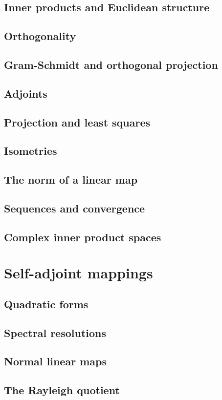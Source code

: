 \documentclass{article}
\begin{document}
\subsection{Inner products and Euclidean structure}
\subsection{Orthogonality}
\subsection{Gram-Schmidt and orthogonal projection}
\subsection{Adjoints}
\subsection{Projection and least squares}
\subsection{Isometries}
\subsection{The norm of a linear map}
\subsection{Sequences and convergence}
\subsection{Complex inner product spaces}
\section{Self-adjoint mappings}
\subsection{Quadratic forms}
\subsection{Spectral resolutions}
\subsection{Normal linear maps}
\subsection{The Rayleigh quotient}
\end{document}
